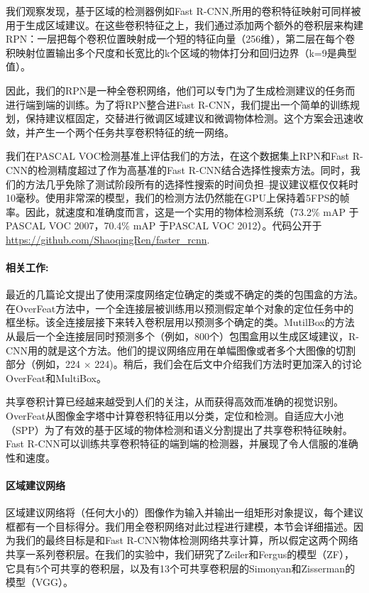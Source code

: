 \documentclass[12pt,a4paper,titlepage]{article}
\begin{document}
我们观察发现，基于区域的检测器例如Fast R-CNN,所用的卷积特征映射可同样被用于生成区域建议。在这些卷积特征之上，我们通过添加两个额外的卷积层来构建RPN：一层把每个卷积位置映射成一个短的特征向量（256维），第二层在每个卷积映射位置输出多个尺度和长宽比的k个区域的物体打分和回归边界（k=9是典型值）。\par

因此，我们的RPN是一种全卷积网络，他们可以专门为了生成检测建议的任务而进行端到端的训练。为了将RPN整合进Fast R-CNN，我们提出一个简单的训练规划，保持建议框固定，交替进行微调区域建议和微调物体检测。这个方案会迅速收敛，并产生一个两个任务共享卷积特征的统一网络。\par

我们在PASCAL VOC检测基准上评估我们的方法，在这个数据集上RPN和Fast R-CNN的检测精度超过了作为高基准的Fast R-CNN结合选择性搜索方法。同时，我们的方法几乎免除了测试阶段所有的选择性搜索的时间负担--提议建议框仅仅耗时10毫秒。使用非常深的模型，我们的检测方法仍然能在GPU上保持着5FPS的帧率。因此，就速度和准确度而言，这是一个实用的物体检测系统（73.2\% mAP 于PASCAL VOC 2007，70.4\% mAP 于PASCAL VOC 2012）。代码公开于 \url{https://github.com/ShaoqingRen/faster_rcnn}.

\paragraph{相关工作:}
最近的几篇论文提出了使用深度网络定位确定的类或不确定的类的包围盒的方法。在OverFeat方法中，一个全连接层被训练用以预测假定单个对象的定位任务中的框坐标。该全连接层接下来转入卷积层用以预测多个确定的类。MutilBox的方法从最后一个全连接层同时预测多个（例如，800个）包围盒用以生成区域建议，R-CNN用的就是这个方法。他们的提议网络应用在单幅图像或者多个大图像的切割部分（例如，224 $\times$ 224)。稍后，我们会在后文中介绍我们方法时更加深入的讨论OverFeat和MultiBox。\par

共享卷积计算已经越来越受到人们的关注，从而获得高效而准确的视觉识别。OverFeat从图像金字塔中计算卷积特征用以分类，定位和检测。自适应大小池（SPP）为了有效的基于区域的物体检测和语义分割提出了共享卷积特征映射。Fast R-CNN可以训练共享卷积特征的端到端的检测器，并展现了令人信服的准确性和速度。

\paragraph{区域建议网络}
区域建议网络将（任何大小的）图像作为输入并输出一组矩形对象提议，每个建议框都有一个目标得分。我们用全卷积网络对此过程进行建模，本节会详细描述。因为我们的最终目标是和Fast R-CNN物体检测网络共享计算，所以假定这两个网络共享一系列卷积层。在我们的实验中，我们研究了Zeiler和Fergus的模型（ZF），它具有5个可共享的卷积层，以及有13个可共享卷积层的Simonyan和Zisserman的模型（VGG）。\par
\end{document}
